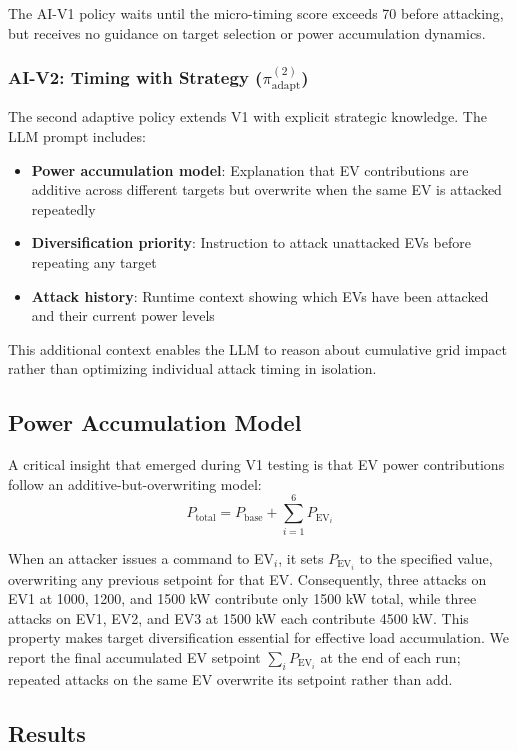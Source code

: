 The AI-V1 policy waits until the micro-timing score exceeds 70 before attacking, but receives no guidance on target selection or power accumulation dynamics.

\subsubsection{AI-V2: Timing with Strategy ($\pi_{\text{adapt}}^{(2)}$)}
The second adaptive policy extends V1 with explicit strategic knowledge. The LLM prompt includes:
\begin{itemize}
    \item \textbf{Power accumulation model}: Explanation that EV contributions are additive across different targets but overwrite when the same EV is attacked repeatedly
    \item \textbf{Diversification priority}: Instruction to attack unattacked EVs before repeating any target
    \item \textbf{Attack history}: Runtime context showing which EVs have been attacked and their current power levels
\end{itemize}

This additional context enables the LLM to reason about cumulative grid impact rather than optimizing individual attack timing in isolation.

\subsection{Power Accumulation Model}

A critical insight that emerged during V1 testing is that EV power contributions follow an additive-but-overwriting model:
\begin{equation}
P_{\text{total}} = P_{\text{base}} + \sum_{i=1}^{6} P_{\text{EV}_i}
\end{equation}

When an attacker issues a command to EV$_i$, it sets $P_{\text{EV}_i}$ to the specified value, overwriting any previous setpoint for that EV. Consequently, three attacks on EV1 at 1000, 1200, and 1500 kW contribute only 1500 kW total, while three attacks on EV1, EV2, and EV3 at 1500 kW each contribute 4500 kW. This property makes target diversification essential for effective load accumulation. We report the final accumulated EV setpoint $\sum_i P_{\text{EV}_i}$ at the end of each run; repeated attacks on the same EV overwrite its setpoint rather than add.

\subsection{Results}

